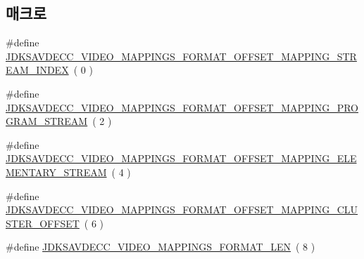 \subsection*{매크로}
\begin{DoxyCompactItemize}
\item 
\#define \hyperlink{group__video__mappings__format_ga381015b3c573c0b1f84047473b62417f}{J\+D\+K\+S\+A\+V\+D\+E\+C\+C\+\_\+\+V\+I\+D\+E\+O\+\_\+\+M\+A\+P\+P\+I\+N\+G\+S\+\_\+\+F\+O\+R\+M\+A\+T\+\_\+\+O\+F\+F\+S\+E\+T\+\_\+\+M\+A\+P\+P\+I\+N\+G\+\_\+\+S\+T\+R\+E\+A\+M\+\_\+\+I\+N\+D\+EX}~( 0 )
\item 
\#define \hyperlink{group__video__mappings__format_ga281a7ba358708b70dc4c330df31b47ef}{J\+D\+K\+S\+A\+V\+D\+E\+C\+C\+\_\+\+V\+I\+D\+E\+O\+\_\+\+M\+A\+P\+P\+I\+N\+G\+S\+\_\+\+F\+O\+R\+M\+A\+T\+\_\+\+O\+F\+F\+S\+E\+T\+\_\+\+M\+A\+P\+P\+I\+N\+G\+\_\+\+P\+R\+O\+G\+R\+A\+M\+\_\+\+S\+T\+R\+E\+AM}~( 2 )
\item 
\#define \hyperlink{group__video__mappings__format_ga17fd919c614e8d21cfa763a967897642}{J\+D\+K\+S\+A\+V\+D\+E\+C\+C\+\_\+\+V\+I\+D\+E\+O\+\_\+\+M\+A\+P\+P\+I\+N\+G\+S\+\_\+\+F\+O\+R\+M\+A\+T\+\_\+\+O\+F\+F\+S\+E\+T\+\_\+\+M\+A\+P\+P\+I\+N\+G\+\_\+\+E\+L\+E\+M\+E\+N\+T\+A\+R\+Y\+\_\+\+S\+T\+R\+E\+AM}~( 4 )
\item 
\#define \hyperlink{group__video__mappings__format_ga82875713f9269add7ed6c5b2b920805a}{J\+D\+K\+S\+A\+V\+D\+E\+C\+C\+\_\+\+V\+I\+D\+E\+O\+\_\+\+M\+A\+P\+P\+I\+N\+G\+S\+\_\+\+F\+O\+R\+M\+A\+T\+\_\+\+O\+F\+F\+S\+E\+T\+\_\+\+M\+A\+P\+P\+I\+N\+G\+\_\+\+C\+L\+U\+S\+T\+E\+R\+\_\+\+O\+F\+F\+S\+ET}~( 6 )
\item 
\#define \hyperlink{group__video__mappings__format_gabb8ba2fa0ffcfce879a8694568f54ded}{J\+D\+K\+S\+A\+V\+D\+E\+C\+C\+\_\+\+V\+I\+D\+E\+O\+\_\+\+M\+A\+P\+P\+I\+N\+G\+S\+\_\+\+F\+O\+R\+M\+A\+T\+\_\+\+L\+EN}~( 8 )
\end{DoxyCompactItemize}
